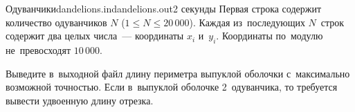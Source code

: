 \begin{problem}{Одуванчики}{dandelions.in}{dandelions.out}{2 секунды}
\InputFile
Первая строка содержит количество одуванчиков $N$ ($1 \leqslant N \leqslant 20\,000$).
Каждая из~последующих $N$~строк содержит два целых числа~--- координаты 
$x_i$ и~$y_i$. Координаты по~модулю не~превосходят $10\,000$.

\OutputFile
Выведите в~выходной файл длину периметра выпуклой оболочки с~максимально возможной точностью.
Если в~выпуклой оболочке 2~одуванчика, то требуется вывести удвоенную длину отрезка.


\Example

\begin{example}
%
\end{example}

\end{problem}
